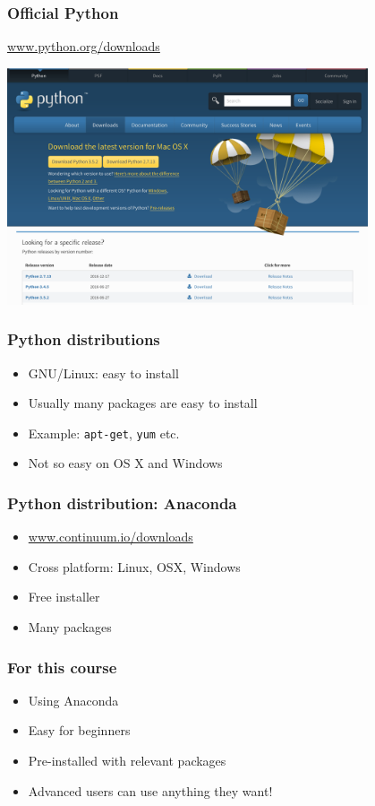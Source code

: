\documentclass[14pt,compress]{beamer}
\newcommand{\typ}[1]{\lstinline{#1}}
\begin{document}
\begin{frame}[plain]
  \frametitle{Official Python}
  \begin{center}
    \url{www.python.org/downloads}

    \includegraphics[height=2.75in]{data/intro/python_download}
  \end{center}
\end{frame}

\begin{frame}
  \frametitle{Python distributions}
  \begin{itemize}
  \item GNU/Linux: easy to install
  \item Usually many packages are easy to install
  \item Example: \typ{apt-get}, \typ{yum} etc.
  \item Not so easy on OS X and Windows
  \end{itemize}
\end{frame}

\begin{frame}
  \frametitle{Python distribution: Anaconda}
  \begin{itemize}
  \item \url{www.continuum.io/downloads}
  \item Cross platform: Linux, OSX, Windows
  \item Free installer
  \item Many packages
  \end{itemize}
\end{frame}

\begin{frame}[plain]
  \frametitle{For this course}
  \begin{itemize}
  \item Using Anaconda
  \item Easy for beginners
  \item Pre-installed with relevant packages
    \vspace*{0.25in}
  \item Advanced users can use anything they want!
  \end{itemize}
\end{frame}
\end{document}
